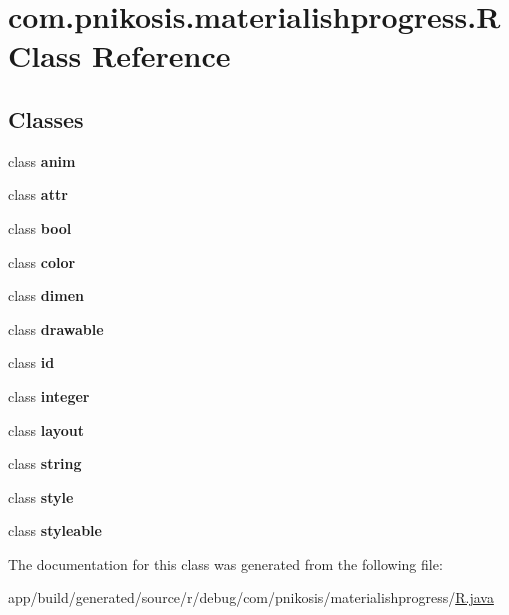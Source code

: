 \hypertarget{classcom_1_1pnikosis_1_1materialishprogress_1_1_r}{}\section{com.\+pnikosis.\+materialishprogress.\+R Class Reference}
\label{classcom_1_1pnikosis_1_1materialishprogress_1_1_r}
\subsection*{Classes}
\begin{DoxyCompactItemize}
\item 
class {\bfseries anim}
\item 
class {\bfseries attr}
\item 
class {\bfseries bool}
\item 
class {\bfseries color}
\item 
class {\bfseries dimen}
\item 
class {\bfseries drawable}
\item 
class {\bfseries id}
\item 
class {\bfseries integer}
\item 
class {\bfseries layout}
\item 
class {\bfseries string}
\item 
class {\bfseries style}
\item 
class {\bfseries styleable}
\end{DoxyCompactItemize}


The documentation for this class was generated from the following file\+:\begin{DoxyCompactItemize}
\item 
app/build/generated/source/r/debug/com/pnikosis/materialishprogress/\hyperlink{app_2build_2generated_2source_2r_2debug_2com_2pnikosis_2materialishprogress_2_r_8java}{R.\+java}\end{DoxyCompactItemize}
